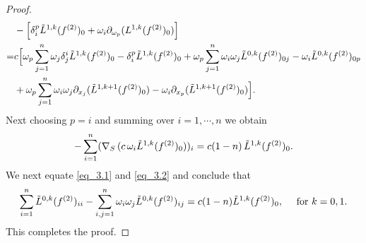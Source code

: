 \documentclass[11pt,a4paper,reqno]{amsart}
\begin{document}
\begin{proof}
\begin{equation*}
\begin{aligned}
				&-\Big[\delta_i^p \Tilde{L}^{1,k}(f^{(2)})_0+\omega_i \partial_{\omega_p}(L^{1,k}(f^{(2)})_0)\Big]\\
		=&c\Big[\omega_p\sum_{j=1}^{n}\omega_j \delta_j^i \Tilde{L}^{1,k}(f^{(2)})_0 -\delta_i^p \Tilde{L}^{1,k}(f^{(2)})_0+\omega_p\sum_{j=1}^{n}\omega_i \omega_j\Tilde{L}^{0,k}(f^{(2)})_{0j}-\omega_i \Tilde{L}^{0,k}(f^{(2)})_{0p}\\
				&+\omega_p \sum_{j=1}^{n}\omega_i \omega_j \partial_{x_j}(\Tilde{L}^{1,k+1}(f^{(2)})_0 )-\omega_i \partial_{x_p}(\Tilde{L}^{1,k+1}(f^{(2)})_0)\Big].
			\end{aligned}
		\end{equation*}
		Next choosing $p=i$ and summing over $i=1,\cdots,n$ we obtain
		\begin{align}\label{eq_3.2}
-\sum_{i=1}^n(\nabla_{S}\, (c\,\omega_{i}\Tilde{L}^{1,k}(f^{(2)})_{0}))_i= c(1-n)\, \Tilde{L}^{1,k}(f^{(2)})_0.
		\end{align}
	We next equate \eqref{eq_3.1} and \eqref{eq_3.2} and conclude  that
		\begin{equation}\label{help1}
			\sum_{i=1}^{n}\Tilde{L}^{0,k}(f^{(2)})_{ii}-\sum_{i,j=1}^{n}\omega_{i} \omega_{j}\Tilde{L}^{0,k}(f^{(2)})_{ij}=c(1-n)\Tilde{L}^{1,k}(f^{(2)})_0, \quad \text{ for } k=0,1.
		\end{equation}
		This completes the proof.
	\end{proof}
\end{document}
